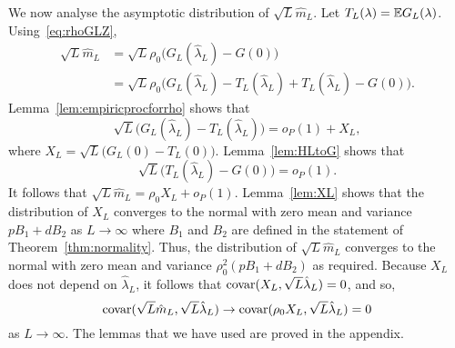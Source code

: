 \documentclass[journal]{IEEEtran}
\begin{document}
We now analyse the asymptotic distribution of $\sqrt{L} \hat{m}_L$.  Let $T_L(\lambda) = {\mathbb E} G_L(\lambda)$.  Using~\eqref{eq:rhoGLZ},
\begin{align*}
\sqrt{L} \hat{m}_L &= \sqrt{L} \rho_0 \big( G_L(\hat{\lambda}_L) - G(0) \big) \\
&= \sqrt{L} \rho_0 \big( G_L(\hat{\lambda}_L) - T_L(\hat{\lambda}_L) + T_L(\hat{\lambda}_L) - G(0) \big).
\end{align*}
Lemma~\ref{lem:empiricprocforrho} shows that 
\[
\sqrt{L}\big( G_L(\hat{\lambda}_L) - T_L(\hat{\lambda}_L)  \big) = o_P(1) + X_L,
\]
where $X_L = \sqrt{L}\big( G_L(0) - T_L(0)  \big)$.  Lemma~\ref{lem:HLtoG} shows that
\[
\sqrt{L}\big( T_L(\hat{\lambda}_L) - G(0) \big) = o_P(1).
\]
It follows that $\sqrt{L} \hat{m}_L =  \rho_0 X_L + o_P(1)$.  Lemma~\ref{lem:XL} shows that the distribution of $X_L$ converges to the normal with zero mean and variance $p B_1 + d B_2$ as $L\rightarrow\infty$ where $B_1$ and $B_2$ are defined in the statement of Theorem~\ref{thm:normality}.  Thus, the distribution of $\sqrt{L} \hat{m}_L$ converges to the normal with zero mean and variance $\rho_0^2(p B_1 + d B_2)$ as required.  Because $X_L$ does not depend on $\hat{\lambda}_L$, it follows that $\operatorname{covar}(X_L, \sqrt{L}\hat{\lambda}_L) = 0$, and so,
\[
\operatorname{covar}(\sqrt{L}\hat{m}_L, \sqrt{L}\hat{\lambda}_L) \rightarrow \operatorname{covar}(\rho_0 X_L, \sqrt{L}\hat{\lambda}_L) = 0
\]
as $L \rightarrow \infty$.  The lemmas that we have used are proved in the appendix.



\end{document}
